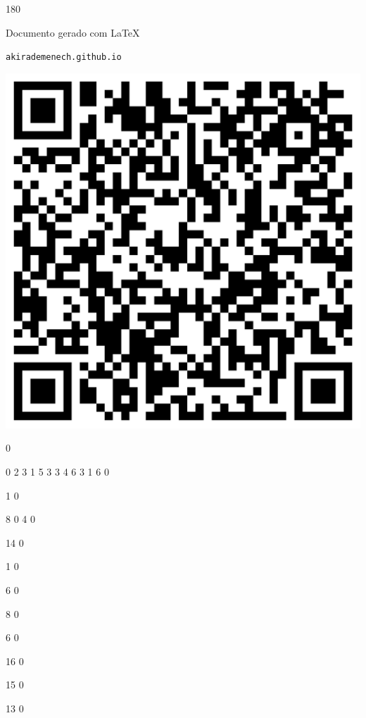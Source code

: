 \documentclass[12pt]{article}
\begin{document}
	\begin{turn}{180}	
		\begin{minipage}{\textwidth}		  
		  Documento gerado com \LaTeX			
		  
		  \texttt{akirademenech.github.io}

		  \includegraphics[height=0.3\textheight]{2e-2.pdf}

		\end{minipage}	
	\end{turn}  
		  
		\vfill  
		  
{
	0	%

	0	%
	2	%
	3	%
	1	%
	5	%
	3	%
	3	%
	4	%
	6	%
	3	%
	1	%
	6	%
	0	%

	1	%
	0	%

	8	%
	0	%
	4	%
	0	%

	14	%
	0	%

	1	%
	0	%

	6	%
	0	%

	8	%
	0	%

	6	%
	0	%

	16	%
	0	%

	15	%
	0	%

	13	%
	0	%

}	  
		    	
\end{document}
